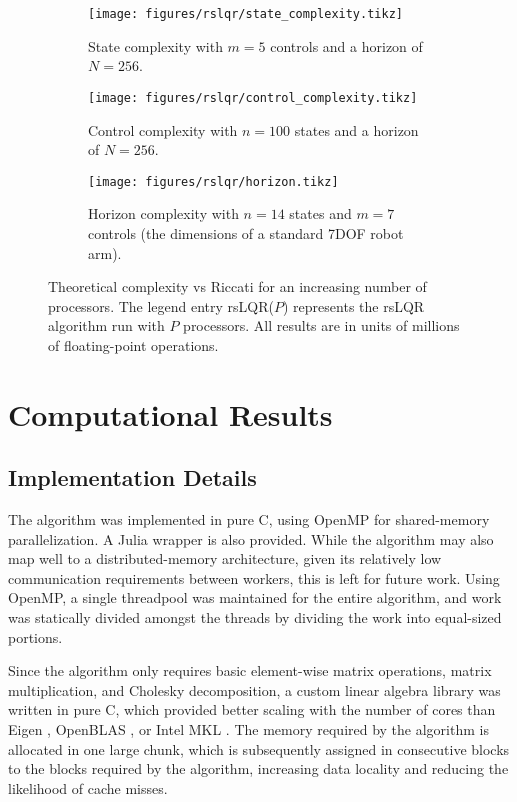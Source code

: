 \documentclass[../root.tex]{subfiles}
\newcommand{\0}{{\transparent{0} \resizebox{\mycellheight}{\mycellheight}{0}}}
\begin{document}
\begin{figure}
    \centering
    \begin{subfigure}[b]{0.49\columnwidth}
        \texttt{[image: figures/rslqr/state\_complexity.tikz]}
        \captionsetup{width=0.9\textwidth}
        \caption{State complexity with $m=5$ controls and a horizon of $N=256$.}
    \end{subfigure}
    \begin{subfigure}[b]{0.49\columnwidth}
        \texttt{[image: figures/rslqr/control\_complexity.tikz]}
        \captionsetup{width=0.9\textwidth}
        \caption{Control complexity with $n=100$ states and a horizon of $N=256$.}
    \end{subfigure}
    \begin{subfigure}[b]{\columnwidth}
        \texttt{[image: figures/rslqr/horizon.tikz]}
        \caption{Horizon complexity with $n=14$ states and $m=7$ controls (the dimensions of
        a standard 7DOF robot arm).}
    \end{subfigure}
    \caption{Theoretical complexity vs Riccati for an increasing number of processors. 
        The legend entry rsLQR($P$) represents the rsLQR algorithm run with $P$ processors.
        All results are in units of millions of floating-point operations. 
    }
    \label{fig:complexity_theoretical}
\end{figure}

\section{Computational Results} \label{sec:results_actual}
\subsection{Implementation Details}

The algorithm was implemented in pure C, using OpenMP for shared-memory parallelization.  A
Julia wrapper is also provided.  While the algorithm may also map well to a
distributed-memory architecture, given its relatively low communication requirements between
workers, this is left for future work.  
Using OpenMP, a single threadpool was maintained for the entire algorithm, and work was
statically divided amongst the threads by dividing the work into equal-sized portions.

Since the algorithm only requires basic element-wise matrix operations, matrix
multiplication, and Cholesky decomposition, a custom linear algebra library was
written in pure C, which provided better scaling with the number of cores than
Eigen \cite{guennebaud_Eigen_2010}, OpenBLAS \cite{xianyi_Modeldriven_2012}, or
Intel MKL \cite{intel_Intel_2022}. The memory required by the algorithm is
allocated in one large chunk, which is subsequently assigned in consecutive
blocks to the blocks required by the algorithm, increasing data locality and
reducing the likelihood of cache misses.
\end{document}
